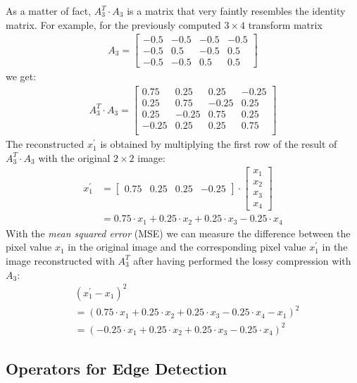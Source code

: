 \documentclass[a4paper,twocolumn]{article}
\begin{document}
	As a matter of fact, $A_3^T \cdot A_3$ is a matrix that very faintly resembles the identity matrix. For example, for the previously computed $3 \times 4$ transform matrix
	\begin{align*}
	A_3 =
	\begin{bmatrix}
	-0.5 & -0.5 & -0.5 & -0.5 \\
	-0.5 & 0.5 & -0.5 & 0.5 \\
	-0.5 & -0.5 & 0.5 & 0.5
	\end{bmatrix}
	\end{align*}
	we get:
	\begin{align*}
	A_3^T \cdot A_3 =
	\begin{bmatrix}
	0.75 & 0.25 & 0.25 & -0.25 \\
	0.25 & 0.75 & -0.25 & 0.25 \\
	0.25 & -0.25 & 0.75 & 0.25 \\
	-0.25 & 0.25 & 0.25 & 0.75 \\
	\end{bmatrix}
	\end{align*}
	The reconstructed $x_1^{\prime}$ is obtained by multiplying the first row of the result of $A_3^T \cdot A_3$ with the original $2 \times 2$ image:
	\begin{align*}
	x_1^{\prime} &=
	\begin{bmatrix}
	0.75 & 0.25 & 0.25 & -0.25
	\end{bmatrix}
	\cdot
	\begin{bmatrix}
	x_1 \\ x_2 \\ x_3 \\ x_4
	\end{bmatrix} \\
	&= 0.75 \cdot x_1 + 0.25 \cdot x_2 + 0.25 \cdot x_3 - 0.25 \cdot x_4
	\end{align*}
	With the \textit{mean squared error} (MSE) we can measure the difference between the pixel value $x_1$ in the original image and the corresponding pixel value $x_1^{\prime}$ in the image reconstructed with $A_3^T$ after having performed the lossy compression with $A_3$:
	\begin{align*}
	&(x_1^{\prime} - x_1)^2 \\
	&= (0.75 \cdot x_1 + 0.25 \cdot x_2 + 0.25 \cdot x_3 - 0.25 \cdot x_4 - x_1)^2 \\
	&= (-0.25 \cdot x_1 + 0.25 \cdot x_2 + 0.25 \cdot x_3 - 0.25 \cdot x_4)^2
	\end{align*}
	
	\subsection{Operators for Edge Detection}
	
\end{document}
